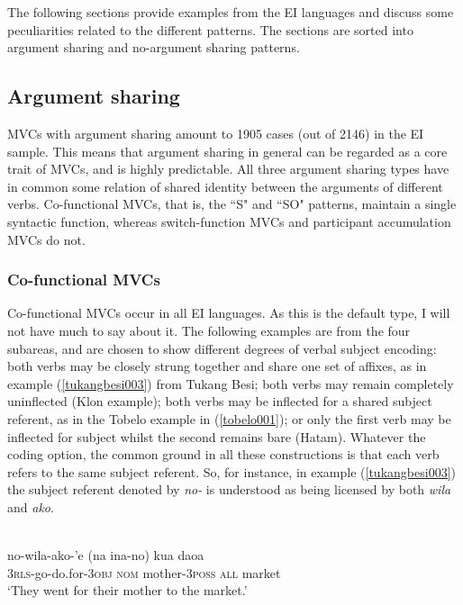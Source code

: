 The following sections provide examples from the EI languages and discuss some peculiarities related to the different patterns. The sections are sorted into argument sharing and no-argument sharing patterns.

\subsection{Argument sharing}

MVCs with argument sharing amount to 1905 cases (out of 2146) in the EI sample. This means that argument sharing in general can be regarded as a core trait of MVCs, and is highly predictable. All three argument sharing types have in common some relation of shared identity between the arguments of different verbs. Co-functional MVCs, that is, the ``S" and ``SO" patterns, maintain a single syntactic function, whereas switch-function MVCs and participant accumulation MVCs do not.

\subsubsection{Co-functional MVCs}

Co-functional MVCs occur in all EI languages. As this is the default type, I will not have much to say about it. The following examples are from the four subareas, and are chosen to show different degrees of verbal subject encoding: both verbs may be closely strung together and share one set of affixes, as in example (\ref{tukangbesi003}) from Tukang Besi; both verbs may remain completely uninflected (Klon example); both verbs may be inflected for a shared subject referent, as in the Tobelo example in (\ref{tobelo001}); or only the first verb may be inflected for subject whilst the second remains bare (Hatam). Whatever the coding option, the common ground in all these constructions is that each verb refers to the same subject referent. So, for instance, in example (\ref{tukangbesi003}) the subject referent denoted by \textit{no-} is understood as being licensed by both \textit{wila} and \textit{ako}.

\ea \label{tukangbesi003}
\\
\gll no-wila-ako-'e (na ina-no) kua daoa \\
3\textsc{rls}-go-do.for-3\textsc{obj} \textsc{nom} mother-3\textsc{poss} \textsc{all} market \\
\glft `They went for their mother to the market.'\\ 
\z

